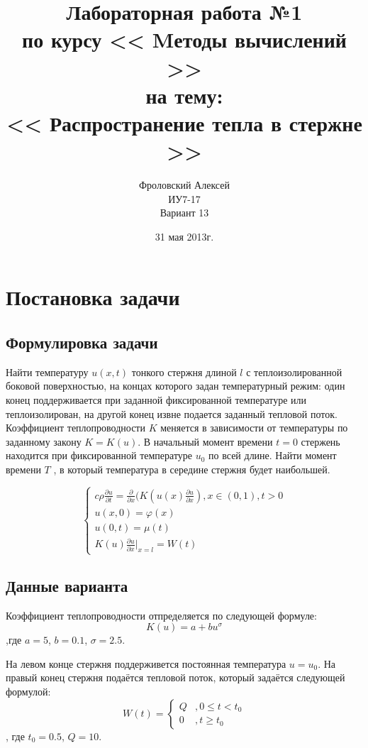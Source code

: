 \documentclass[a4paper,12pt]{report}
\author{Фроловский Алексей \\ ИУ7-17 \\ Вариант 13}
\title{Лабораторная работа №1 \\ по курсу << Mетоды вычислений >>  \\ на тему: \\  
<< Распространение тепла в стержне >> }
\date{31 мая 2013г.}
\begin{document}
\maketitle

\chapter{Постановка задачи}
\section{Формулировка задачи}
Найти температуру $u(x, t)$ тонкого стержня длиной $l$ с теплоизолированной боковой поверхностью, 
на концах которого задан температурный режим: один конец поддерживается при заданной
фиксированной температуре или теплоизолирован, на другой конец извне подается заданный 
тепловой поток. Коэффициент теплопроводности $K$ меняется в зависимости от температуры по 
заданному закону $K = K(u)$. В начальный момент времени $t = 0$ стержень находится при фиксированной
температуре $u_{0}$ по всей длине. Найти момент времени $T$ , в который температура в середине 
стержня будет наибольшей.

\begin{displaymath}
	\left\{
		\begin{array}{l}
			c \rho \frac{\partial u}{\partial t}=\frac{\partial}{\partial x}(K(u(x)\frac{\partial u}{\partial x}), x \in (0, 1), t > 0 \\
			u(x, 0) =  \varphi (x)  \\
			u(0, t) =  \mu (t)  \\
			K(u) \frac{\partial u}{\partial x} \vert_{x = l} = W(t)
		\end{array} \right.
\end{displaymath}

\section{Данные варианта}
Коэффициент теплопроводности отпределяется по следующей формуле:
\begin{equation}
	K(u) = a + bu^{\sigma}
\end{equation}
,где $a = 5$, $b= 0.1$, $\sigma=2.5$.

На левом конце стержня поддерживется постоянная температура $u = u_{0}$. На правый конец стержня подаётся тепловой 
поток, который задаётся следующей формулой:
\begin{displaymath}
	W(t) = \left\{
		\begin{array}{ll}
			Q & ,0 \le t <  t_{0} \\
			0 & ,t \ge t_{0}
		\end{array} \right.
\end{displaymath}
, где $t_{0} = 0.5$, $Q = 10$.
\end{document}
